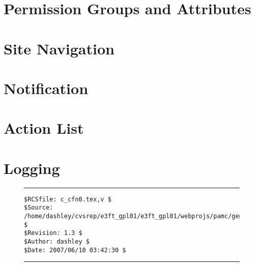 \section{Permission Groups and Attributes}
\label{ccfn0:sgra0}


\section{Site Navigation}
\label{ccfn0:ssng0}


\section{Notification}
\label{ccfn0:snot0}


\section{Action List}
\label{ccfn0:sacl0}


\section{Logging}
\label{ccfn0:slog0}



\noindent\begin{figure}[!b]
\noindent\rule[-0.25in]{\textwidth}{1pt}
\begin{tiny}
\begin{verbatim}
$RCSfile: c_cfn0.tex,v $
$Source: /home/dashley/cvsrep/e3ft_gpl01/e3ft_gpl01/webprojs/pamc/gen_a/docs/manual/man_a/c_cfn0/c_cfn0.tex,v $
$Revision: 1.3 $
$Author: dashley $
$Date: 2007/06/10 03:42:30 $
\end{verbatim}
\end{tiny}
\noindent\rule[0.25in]{\textwidth}{1pt}
\end{figure}

%
%
%
